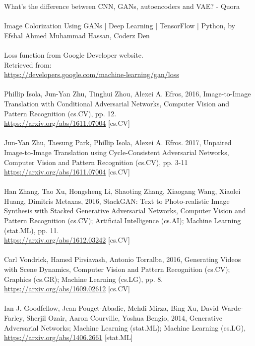 \documentclass[14pt]{article}
\begin{document}
What's the difference between CNN, GANs, autoencoders and VAE? - Quora 
\\
\\
[4] Image Colorization Using GANs | Deep Learning | TensorFlow | Python, by Efshal Ahmed Muhammad Hassan, Coderz Den 
\\
\\
[5] Loss function from Google Developer website.\\ Retrieved from:\\ \url{https://developers.google.com/machine-learning/gan/loss }
\\ \\ 
[6] Phillip Isola, Jun-Yan Zhu, Tinghui Zhou, Alexei A. Efros, 2016, Image-to-Image Translation with Conditional Adversarial Networks, Computer Vision and Pattern Recognition (cs.CV), pp. 12.
\\\url{https://arxiv.org/abs/1611.07004} [cs.CV] 
\\
\\
[7] Jun-Yan Zhu, Taesung Park, Phillip Isola, Alexei A. Efros. 2017, Unpaired Image-to-Image Translation using Cycle-Consistent Adversarial Networks, Computer Vision and Pattern Recognition (cs.CV),  pp. 3-11 
\\
\url{https://arxiv.org/abs/1611.07004} [cs.CV] 
\\
\\
[8] Han Zhang, Tao Xu, Hongsheng Li, Shaoting Zhang, Xiaogang Wang, Xiaolei Huang, Dimitris Metaxas, 2016, StackGAN: Text to Photo-realistic Image Synthesis with Stacked Generative Adversarial Networks, Computer Vision and Pattern Recognition (cs.CV); Artificial Intelligence (cs.AI); Machine Learning (stat.ML), pp. 11.\\
\url{https://arxiv.org/abs/1612.03242} [cs.CV] 
\\
\\
[9] Carl Vondrick, Hamed Pirsiavash, Antonio Torralba, 2016, Generating Videos with Scene Dynamics, Computer Vision and Pattern Recognition (cs.CV); Graphics (cs.GR); Machine Learning (cs.LG), pp. 8.\\ \url{https://arxiv.org/abs/1609.02612} [cs.CV] 
\\
\\
[10] Ian J. Goodfellow, Jean Pouget-Abadie, Mehdi Mirza, Bing Xu, David Warde-Farley, Sherjil Ozair, Aaron Courville, Yoshua Bengio, 2014, Generative Adversarial Networks; Machine Learning (stat.ML); Machine Learning (cs.LG), \\\url{https://arxiv.org/abs/1406.2661} [stat.ML] 
\end{document}
